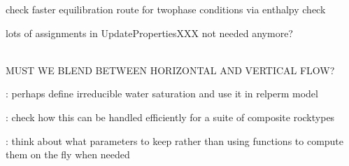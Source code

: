 \begin{DoxyRefList}
\begin{DoxyItemize}
\item check faster equilibration route for twophase conditions via enthalpy check
\item lots of assignments in Update\+Properties\+XXX not needed anymore? 
\end{DoxyItemize}
\item[Class \doxylink{classcsmp_1_1_heterogeneity_and_rate_aware_model}{csmp\+::Heterogeneity\+And\+Rate\+Aware\+Model\texorpdfstring{$<$}{<} dim \texorpdfstring{$>$}{>}} ]\hfill \\
\label{todo__todo000230}%
%
MUST WE BLEND BETWEEN HORIZONTAL AND VERTICAL FLOW?

\label{todo__todo000231}%
%
\+: perhaps define irreducible water saturation and use it in relperm model 



\+: check how this can be handled efficiently for a suite of composite rocktypes 



\+: think about what parameters to keep rather than using functions to compute them on the fly when needed


\end{DoxyRefList}
